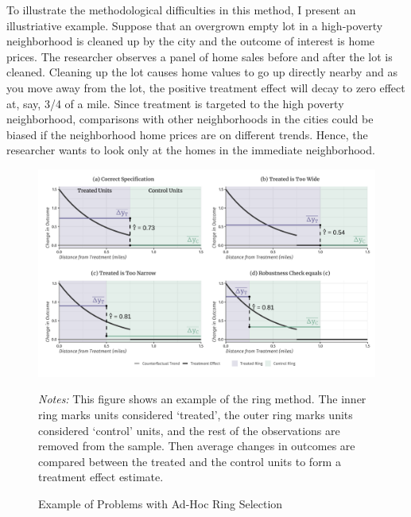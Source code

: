 \documentclass[10pt]{article}
\begin{document}
To illustrate the methodological difficulties in this method, I present an illustriative example. Suppose that an overgrown empty lot in a high-poverty neighborhood is cleaned up by the city and the outcome of interest is home prices. The researcher observes a panel of home sales before and after the lot is cleaned. Cleaning up the lot causes home values to go up directly nearby and as you move away from the lot, the positive treatment effect will decay to zero effect at, say, 3/4 of a mile. Since treatment is targeted to the high poverty neighborhood, comparisons with other neighborhoods in the cities could be biased if the neighborhood home prices are on different trends. Hence, the researcher wants to look only at the homes in the immediate neighborhood.


\begin{figure}[tb]
    \caption{Example of Problems with Ad-Hoc Ring Selection}
    \label{fig:problems}

    \begin{adjustbox}{width = 1.1\textwidth, center}
        \includegraphics[width=\textwidth]{../../figures/example.pdf}
    \end{adjustbox}

    {\footnotesize \emph{Notes:} This figure shows an example of the ring method. The inner ring marks units considered `treated', the outer ring marks units considered `control' units, and the rest of the observations are removed from the sample. Then average changes in outcomes are compared between the treated and the control units to form a treatment effect estimate.}
\end{figure}
\end{document}
